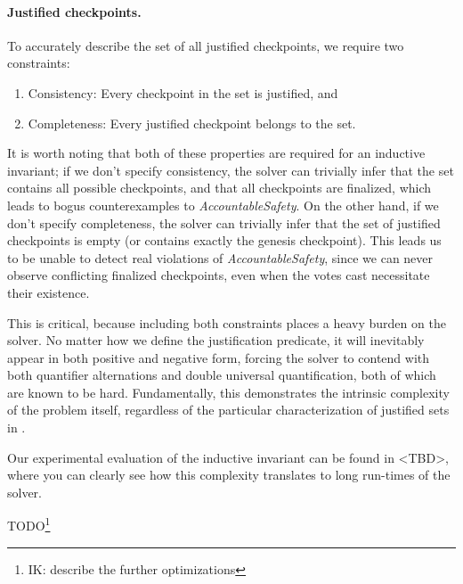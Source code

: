 \paragraph{Justified checkpoints.} To accurately describe the set of all justified checkpoints, we require two constraints:
\begin{enumerate}
	\item Consistency: Every checkpoint in the set is justified, and 
	\item Completeness: Every justified checkpoint belongs to the set.
\end{enumerate}
It is worth noting that both of these properties are required for an inductive invariant; if we don't specify consistency, the solver can trivially infer that the set contains all possible checkpoints, and that all checkpoints are finalized, which leads to bogus counterexamples to \textit{AccountableSafety}.
On the other hand, if we don't specify completeness, the solver can trivially infer that the set of justified checkpoints is empty (or contains exactly the genesis checkpoint). This leads us to be unable to detect real violations of \textit{AccountableSafety}, since we can never observe conflicting finalized checkpoints, even when the votes cast necessitate their existence.

This is critical, because including both constraints places a heavy burden on the solver. No matter how we define the justification predicate, it will inevitably appear in both positive and negative form, forcing the solver to contend with both quantifier alternations and double universal quantification, both of which are known to be hard.
Fundamentally, this demonstrates the intrinsic complexity of the problem itself, regardless of the particular characterization of justified sets in \tlap{}.

Our experimental evaluation of the inductive invariant can be found in <TBD>, where you can clearly see how this complexity translates to long run-times of the solver.


TODO\footnote{IK: describe the further optimizations}

